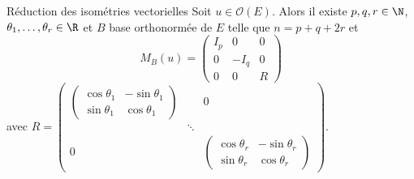 \begin{theoreme}{Réduction des isométries vectorielles}{}
    Soit $u \in \mathcal O(E)$. Alors il existe $p, q, r \in \N$, 
    $\theta_1, \dots, \theta_r \in \R$ et $B$ base orthonormée de $E$ telle que $n = p + q + 2r$ et 
    $$M_B(u) = \begin{pmatrix}
        I_p & 0 & 0 \\
        0 & - I_q & 0 \\
        0 & 0 & R
    \end{pmatrix}$$
    avec $R = \begin{pmatrix}
        \begin{pmatrix} \cos \theta_1 & -\sin \theta_1 \\
        \sin \theta_1 & \cos \theta_1 \end{pmatrix}  & & 0\\
        & \ddots & \\
         0 & & \begin{pmatrix}
            \cos \theta_r & -\sin \theta_r \\
            \sin \theta_r & \cos \theta_r
        \end{pmatrix}
    \end{pmatrix}$.
\end{theoreme}


